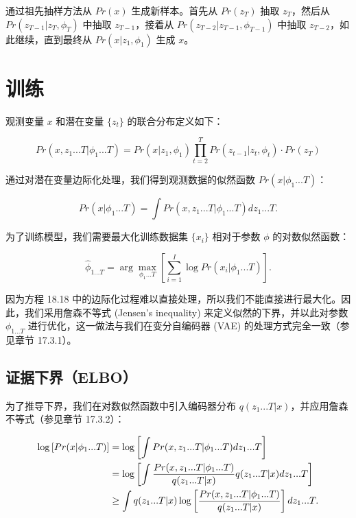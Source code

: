 \documentclass[lang=cn,newtx,10pt,scheme=chinese]{elegantbook}
\begin{document}
通过祖先抽样方法从 \(Pr(x)\) 生成新样本。首先从 \(Pr(z_T)\) 抽取 \(z_T\)，然后从 \(Pr(z_{T-1}|z_T, \phi_T)\) 中抽取 \(z_{T-1}\)，接着从 \(Pr(z_{T-2}|z_{T-1}, \phi_{T-1})\) 中抽取 \(z_{T-2}\)，如此继续，直到最终从 \(Pr(x|z_1, \phi_1)\) 生成 \(x\)。

\section{训练}
观测变量 \(x\) 和潜在变量 \(\{z_t\}\) 的联合分布定义如下：

\begin{equation}
Pr(x, z_1...T|\phi_1...T) = Pr(x|z_1, \phi_1) \prod_{t=2}^{T} Pr(z_{t-1}|z_t, \phi_t) \cdot Pr(z_T) 
\end{equation}

通过对潜在变量边际化处理，我们得到观测数据的似然函数 \(Pr(x|\phi_1...T)\)：

\begin{equation}
Pr(x|\phi_1...T) = \int Pr(x, z_1...T|\phi_1...T)dz_1...T. 
\end{equation}

为了训练模型，我们需要最大化训练数据集 \(\{x_i\}\) 相对于参数 \(\phi\) 的对数似然函数：

\begin{equation}
\hat{\phi}_{1...T} = \arg\max_{\phi_1...T} \left[ \sum_{i=1}^{I} \log Pr(x_i|\phi_1...T) \right]. 
\end{equation}

因为方程 18.18 中的边际化过程难以直接处理，所以我们不能直接进行最大化。因此，我们采用詹森不等式 (Jensen's inequality) 来定义似然的下界，并以此对参数 \(\phi_{1...T}\) 进行优化，这一做法与我们在变分自编码器 (VAE) 的处理方式完全一致（参见章节 17.3.1）。

\subsection{证据下界（ELBO）}
为了推导下界，我们在对数似然函数中引入编码器分布 \(q(z_1...T|x)\)，并应用詹森不等式（参见章节 17.3.2）：


\begin{align}
\log \left[ Pr(x|\phi_1...T) \right] &= \log \left[ \int Pr(x, z_1...T|\phi_1...T)dz_1...T \right] \notag \\
&= \log \left[ \int \frac{Pr(x, z_1...T|\phi_1...T)}{q(z_1...T|x)} q(z_1...T|x) dz_1...T \right]  \notag \\
&\geq \int q(z_1...T|x) \log \left[ \frac{Pr(x, z_1...T|\phi_1...T)}{q(z_1...T|x)} \right] dz_1...T. 
\end{align} 
\end{document}
